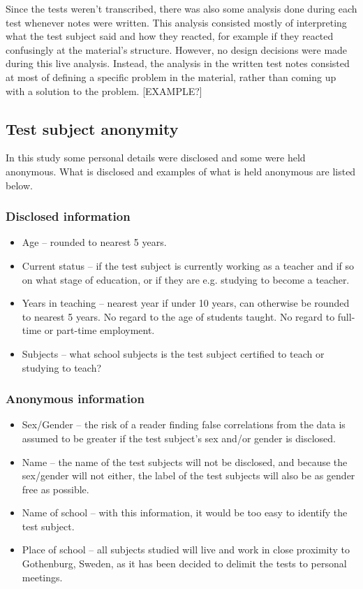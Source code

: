 Since the tests weren't transcribed, there was also some analysis done during each test whenever notes were written. This analysis consisted mostly of interpreting what the test subject said and how they reacted, for example if they reacted confusingly at the material's structure. However, no design decisions were made during this live analysis. Instead, the analysis in the written test notes consisted at most of defining a specific problem in the material, rather than coming up with a solution to the problem. [EXAMPLE?]

\subsection{Test subject anonymity} \label{subjectanonymity}
In this study some personal details were disclosed and some were held anonymous. What is disclosed and examples of what is held anonymous are listed below.

\subsubsection*{Disclosed information}
    \begin{itemize} %
    \item Age – rounded to nearest 5 years.
    \item Current status – if the test subject is currently working as a teacher and if so on what stage of education, or if they are e.g. studying to become a teacher.
    \item Years in teaching – nearest year if under 10 years, can otherwise be rounded to nearest 5 years. No regard to the age of students taught. No regard to full-time or part-time employment.
    \item Subjects – what school subjects is the test subject certified to teach or studying to teach?
\end{itemize}

\subsubsection*{Anonymous information}
\begin{itemize} %
    \item Sex/Gender – the risk of a reader finding false correlations from the data is assumed to be greater if the test subject’s sex and/or gender is disclosed.
    \item Name – the name of the test subjects will not be disclosed, and because the sex/gender will not either, the label of the test subjects will also be as gender free as possible.
    \item Name of school – with this information, it would be too easy to identify the test subject.
    \item Place of school – all subjects studied will live and work in close proximity to Gothenburg, Sweden, as it has been decided to delimit the tests to personal meetings.
\end{itemize}
